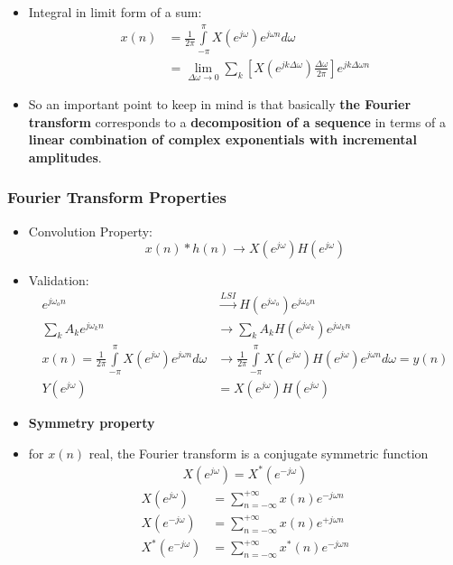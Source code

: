 \documentclass[pdflatex,compress,mathserif]{beamer}
\begin{document}
\begin{frame}
	\begin{itemize}
		\item Integral in limit form of a sum:
		\begin{align*}
		x(n) &= \frac{1}{2\pi}\int\limits_{-\pi}^{\pi}X(e^{j \omega}) e^{j \omega n} d\omega \\
		&= \lim\limits_{\Delta \omega \rightarrow 0} \sum\limits_{k} \left[ X(e^{jk\Delta \omega})\frac{\Delta \omega}{2 \pi} \right] e^{jk\Delta \omega n}
		\end{align*}
		\item So an important point to keep in mind is that basically \textbf{the Fourier transform} corresponds to a \textbf{decomposition of a sequence} in terms of a \textbf{linear combination of complex exponentials with incremental amplitudes}.
	\end{itemize}
\end{frame}

\begin{frame}
	\frametitle{Fourier Transform Properties}
	\begin{itemize}
		\item Convolution Property:
		\[ x(n)*h(n) \rightarrow X(e^{j \omega})H(e^{j \omega}) \]
		\item Validation:
		\begin{align*}
		e^{j \omega_o n} &\xrightarrow{LSI} H(e^{j \omega_o})e^{j\omega_o n} \\
		\sum_k A_k e^{j \omega_k n} &\rightarrow \sum_k A_k H(e^{j \omega_k}) e^{j \omega_k n} \\
		x(n) = \frac{1}{2\pi}\int\limits_{-\pi}^{\pi}X(e^{j \omega}) e^{j \omega n} d\omega &\rightarrow \frac{1}{2\pi} \int\limits_{-\pi}^{\pi}X(e^{j \omega}) H(e^{j \omega}) e^{j \omega n} d\omega = y(n) \\
		Y(e^{j \omega}) &= X(e^{j\omega})H(e^{j\omega})
		\end{align*}
	\end{itemize}
\end{frame}

\begin{frame}
	\begin{itemize}
		\item \textbf{Symmetry property}
		\item[] for $ x(n) $ real, the Fourier transform is a conjugate symmetric function
		\begin{align*}
			X(e^{j\omega}) = X^*(e^{-j\omega})
		\end{align*}
		\begin{align*}
		X(e^{j\omega}) &= \sum_{n = -\infty}^{+\infty} x(n) e^{-j\omega n} \\
		X(e^{-j\omega}) &= \sum_{n = -\infty}^{+\infty} x(n) e^{+j\omega n} \\
		X^*(e^{-j\omega}) &= \sum_{n = -\infty}^{+\infty} x^*(n) e^{-j\omega n} \\
		\end{align*}
	\end{itemize}
\end{frame}
\end{document}
